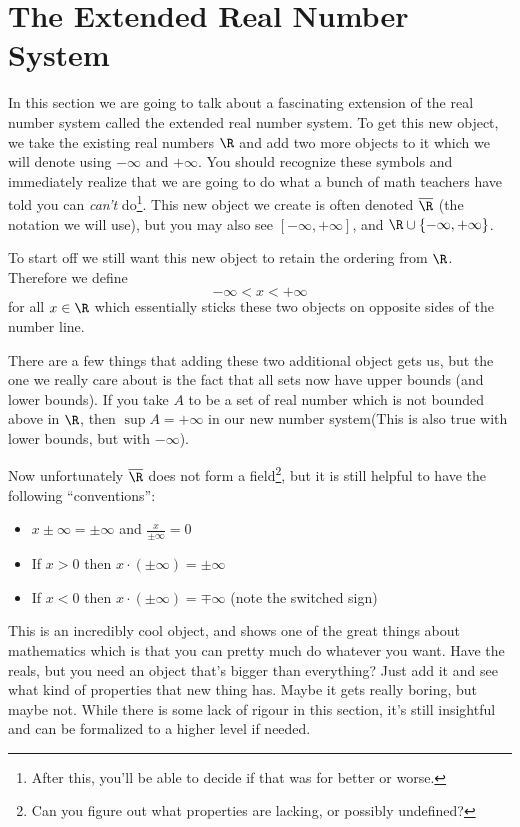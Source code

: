 \section{The Extended Real Number System}\label{sec:extended-real-number-system}

In this section we are going to talk about a fascinating extension of the real
number system called the extended real number system. To get this new object, we
take the existing real numbers $\R$ and add two more objects to it which we will
denote using $-\infty$ and $+\infty$. You should recognize these symbols and
immediately realize that we are going to do what a bunch of math teachers have
told you can \emph{can't} do\footnote{After this, you'll be able to decide if
    that was for better or worse.}. This new object we create is often denoted
$\overline{\R}$ (the notation we will use), but you may also see $[-\infty, +\infty]$,
and $\R \cup \{-\infty, +\infty\}$.

To start off we still want this new object to retain the ordering from $\R$.
Therefore we define
\begin{equation*}
    -\infty < x < +\infty
\end{equation*}
for all $x\in\R$ which essentially sticks these two objects on opposite sides of
the number line.

There are a few things that adding these two additional object gets us, but the
one we really care about is the fact that all sets now have upper bounds (and
lower bounds). If you take $A$ to be a set of real number which is not bounded
above in $\R$, then $\sup{A} = +\infty$ in our new number system(This
is also true with lower bounds, but with $-\infty$).

Now unfortunately $\overline{\R}$ does not form a field\footnote{Can you figure out
    what properties are lacking, or possibly undefined?}, but it is still helpful to have the following
``conventions'':
\begin{itemize}
    \item $x\pm\infty = \pm\infty$ and $\frac{x}{\pm\infty} = 0$
    \item If $x > 0$ then $x\cdot(\pm\infty) = \pm\infty$
    \item If $x < 0$ then $x\cdot(\pm\infty) = \mp\infty$ (note the switched sign)
\end{itemize}

This is an incredibly cool object, and shows one of the great things about
mathematics which is that you can pretty much do whatever you want. Have the
reals, but you need an object that's bigger than everything? Just add it and see
what kind of properties that new thing has. Maybe it gets really boring, but
maybe not. While there is some lack of rigour in this section, it's still
insightful and can be formalized to a higher level if needed.

